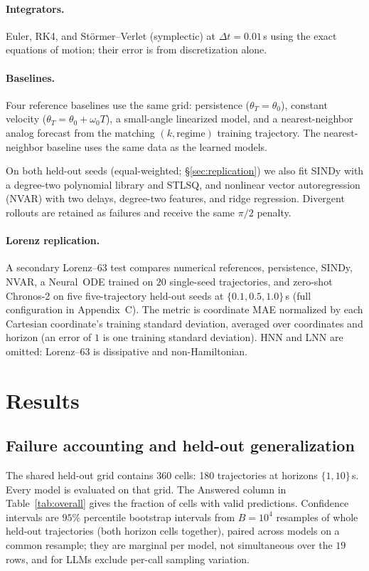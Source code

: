 \documentclass{article}
\begin{document}
\paragraph{Integrators.} Euler, RK4, and St\"ormer--Verlet (symplectic) at $\Delta
t{=}0.01$\,s using the exact equations of motion; their error is from discretization alone.

\paragraph{Baselines.} Four reference baselines use the same grid: persistence
($\theta_T{=}\theta_0$), constant velocity ($\theta_T{=}\theta_0{+}\omega_0T$), a
small-angle linearized model, and a nearest-neighbor analog forecast from the matching
$(k,\mathrm{regime})$ training trajectory. The nearest-neighbor baseline uses the same data as the
learned models.

On both held-out seeds (equal-weighted; \S\ref{sec:replication}) we also fit SINDy
with a degree-two polynomial library and
STLSQ, and nonlinear vector autoregression (NVAR) with two delays, degree-two features, and
ridge regression. Divergent rollouts are retained as failures and receive the same $\pi/2$
penalty.

\paragraph{Lorenz replication.} A secondary Lorenz--63 test compares numerical references,
persistence, SINDy, NVAR, a Neural~ODE trained on $20$ single-seed trajectories, and zero-shot
Chronos-2 on five five-trajectory held-out seeds at $\{0.1,0.5,1.0\}$\,s (full configuration in
Appendix~C). The metric is coordinate MAE normalized by each Cartesian coordinate's training
standard deviation, averaged over coordinates and horizon (an error of $1$ is one training
standard deviation). HNN and LNN are omitted: Lorenz--63 is dissipative and non-Hamiltonian.

\section{Results}
\subsection{Failure accounting and held-out generalization}
\label{sec:reliability}
The shared held-out grid contains $360$ cells: 180 trajectories at horizons $\{1,10\}$\,s.
Every model is evaluated on that grid. The Answered column in Table~\ref{tab:overall} gives the
fraction of cells with valid predictions.
Confidence intervals are $95\%$ percentile bootstrap intervals from $B{=}10^4$ resamples of
whole held-out trajectories (both horizon cells together), paired across models on a common
resample; they are marginal per model, not simultaneous over the $19$ rows, and for LLMs
exclude per-call sampling variation.
\end{document}
